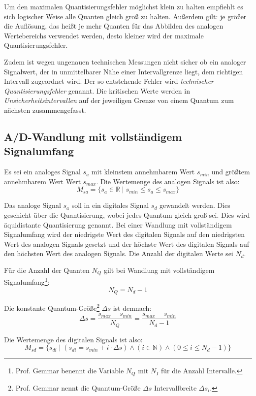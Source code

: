 Um den maximalen Quantisierungsfehler möglichst klein zu halten empfiehlt es sich logischer Weise alle Quanten gleich groß zu halten. Außerdem gilt: je größer die Auflösung, das heißt je mehr Quanten für das Abbilden des analogen Wertebereichs verwendet werden, desto kleiner wird der maximale Quantisierungsfehler.

Zudem ist wegen ungenauen technischen Messungen nicht sicher ob ein analoger Signalwert, der in unmittelbarer Nähe einer Intervallgrenze liegt, dem richtigen Intervall zugeordnet wird. Der so entstehende Fehler wird \textsl{technischer Quantisierungsfehler} genannt. Die kritischen Werte werden in \textsl{Unsicherheitsintervallen} auf der jeweiligen Grenze von einem Quantum zum nächsten zusammengefasst.

\subsection{A/D-Wandlung mit vollständigem Signalumfang}
Es sei ein analoges Signal $s_a$ mit kleinstem annehmbarem Wert $s_{min}$ und größtem annehmbarem Wert Wert $s_{max}$. Die Wertemenge des analogen Signals ist also: 
\[ 
	M_{sa} =  \{ s_a \in \mathbb{R} \mid 
		s_{min} \le s_a \le s_{max} \} 
\]

Das analoge Signal $s_a$ soll in ein digitales Signal $s_d$ gewandelt werden. Dies geschieht über die Quantisierung, wobei jedes Quantum gleich groß sei. Dies wird äquidistante Quantisierung genannt. Bei einer Wandlung mit vollständigem Signalumfang wird der niedrigste Wert des digitalen Signals auf den niedrigsten Wert des analogen Signals gesetzt und der höchste Wert des digitalen Signals auf den höchsten Wert des analogen Signals. Die Anzahl der digitalen Werte sei $N_d$.

Für die Anzahl der Quanten $N_Q$ gilt bei Wandlung mit vollständigem Signalumfang\footnote{Prof. Gemmar benennt die Variable $N_Q$ mit $N_I$ für die Anzahl Intervalle.}:
\[ 
	N_Q = N_d - 1
\]

Die konstante Quantum-Größe\footnote{Prof. Gemmar nennt die Quantum-Größe $\Delta s$ Intervallbreite $\Delta s_i$.} $\Delta s$ ist demnach:
\[ 
	\Delta s = \frac { s_{max} - s_{min} } { N_Q } 
	         = \frac { s_{max} - s_{min} } { N_d - 1 }
\]

Die Wertemenge des digitalen Signals ist also:
\[ 
	M_{sd} =  \{ s_{di} \mid (s_{di} = s_{min} +  i \cdot \Delta s)
	                         \wedge (i \in \mathbb{N})
	                         \wedge (0 \le i \le N_d - 1)  \} 
\]


